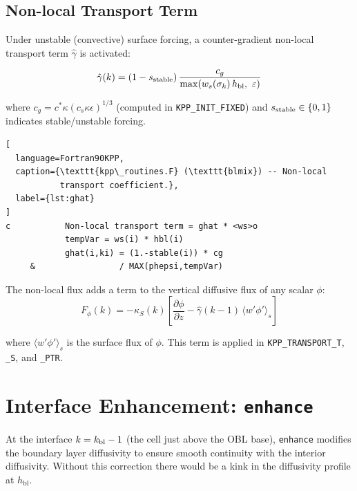 \documentclass[12pt,letterpaper]{article}
\newcommand{\hbl}{h_{\mathrm{bl}}}
\newcommand{\ghat}{\hat{\gamma}}
\begin{document}
\subsection{Non-local Transport Term}  
  
Under unstable (convective) surface forcing, a counter-gradient  
non-local transport term $\ghat$ is activated:  
  
\begin{equation}  
\ghat(k) = (1 - s_{\rm stable})\,\frac{c_g}  
            {\max(w_s(\sigma_k)\,\hbl,\ \varepsilon)}  
\end{equation}  
  
where $c_g = c^* \kappa (c_s \kappa \epsilon)^{1/3}$ (computed in  
\texttt{KPP\_INIT\_FIXED}) and $s_{\rm stable} \in \{0,1\}$ indicates  
stable/unstable forcing.  
  
\begin{lstlisting}[  
  language=Fortran90KPP,  
  caption={\texttt{kpp\_routines.F} (\texttt{blmix}) -- Non-local  
           transport coefficient.},  
  label={lst:ghat}  
]  
c           Non-local transport term = ghat * <ws>o  
            tempVar = ws(i) * hbl(i)  
            ghat(i,ki) = (1.-stable(i)) * cg  
     &                 / MAX(phepsi,tempVar)  
\end{lstlisting}  
  
The non-local flux adds a term to the vertical diffusive flux of any  
scalar $\phi$:  
\begin{equation}  
F_\phi(k) = -\kappa_S(k)\left[\frac{\partial \phi}{\partial z}  
             - \ghat(k-1)\,\langle w'\phi'\rangle_s\right]  
\end{equation}  
  
where $\langle w'\phi'\rangle_s$ is the surface flux of $\phi$. This  
term is applied in \texttt{KPP\_TRANSPORT\_T}, \texttt{\_S}, and  
\texttt{\_PTR}.  
  
\section{Interface Enhancement: \texttt{enhance}}  
  
At the interface $k = k_{\rm bl} - 1$ (the cell just above the  
OBL base), \texttt{enhance} modifies the boundary layer diffusivity  
to ensure smooth continuity with the interior diffusivity. Without this  
correction there would be a kink in the diffusivity profile at $\hbl$.  
  
\end{document}
